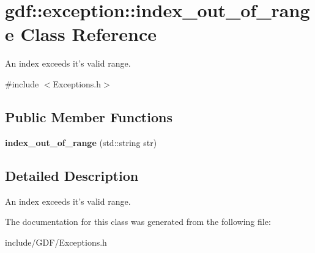 \hypertarget{classgdf_1_1exception_1_1index__out__of__range}{
\section{gdf::exception::index\_\-out\_\-of\_\-range Class Reference}
\label{classgdf_1_1exception_1_1index__out__of__range}
}


An index exceeds it's valid range.  




{\ttfamily \#include $<$Exceptions.h$>$}

\subsection*{Public Member Functions}
\begin{DoxyCompactItemize}
\item 
\hypertarget{classgdf_1_1exception_1_1index__out__of__range_a71007b84649cdf333ef61f35969aa9d3}{
{\bfseries index\_\-out\_\-of\_\-range} (std::string str)}
\label{classgdf_1_1exception_1_1index__out__of__range_a71007b84649cdf333ef61f35969aa9d3}

\end{DoxyCompactItemize}


\subsection{Detailed Description}
An index exceeds it's valid range. 

The documentation for this class was generated from the following file:\begin{DoxyCompactItemize}
\item 
include/GDF/Exceptions.h\end{DoxyCompactItemize}
